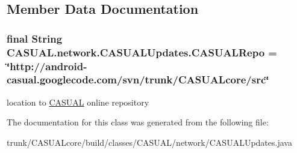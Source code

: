 \subsection{Member Data Documentation}
\hypertarget{class_c_a_s_u_a_l_1_1network_1_1_c_a_s_u_a_l_updates_a9c8e8cf3dcf8d91300de7062d36bcdd1}{
\subsubsection[{C\-A\-S\-U\-A\-L\-Repo}]{\setlength{\rightskip}{0pt plus 5cm}final String C\-A\-S\-U\-A\-L.\-network.\-C\-A\-S\-U\-A\-L\-Updates.\-C\-A\-S\-U\-A\-L\-Repo = \char`\"{}http\-://android-\/casual.\-googlecode.\-com/svn/trunk/C\-A\-S\-U\-A\-Lcore/src\char`\"{}}}\label{class_c_a_s_u_a_l_1_1network_1_1_c_a_s_u_a_l_updates_a9c8e8cf3dcf8d91300de7062d36bcdd1}
location to \hyperlink{namespace_c_a_s_u_a_l}{C\-A\-S\-U\-A\-L} online repository 

The documentation for this class was generated from the following file\-:\begin{DoxyCompactItemize}
\item 
trunk/\-C\-A\-S\-U\-A\-Lcore/build/classes/\-C\-A\-S\-U\-A\-L/network/C\-A\-S\-U\-A\-L\-Updates.\-java\end{DoxyCompactItemize}
